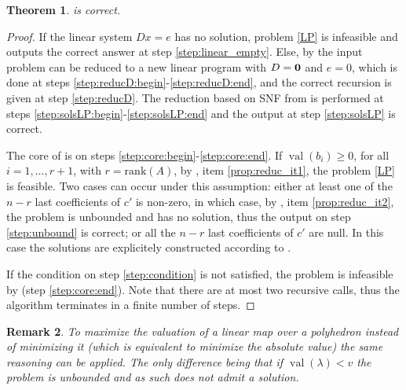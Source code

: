 \documentclass[sigconf]{acmart}
\newtheorem{theorem}{Theorem}[section]
\newtheorem{remark}[theorem]{Remark}
\DeclareMathOperator{\val}{val}
\begin{document}
\begin{theorem}  is correct.
\end{theorem}
\begin{proof}
  If the linear system $Dx=e$ has no solution, problem \eqref{LP} is infeasible
  and  outputs the correct answer at step \ref{step:linear_empty}.
  Else, by  the input problem can be reduced to a new linear
  program with $D={\bf 0}$ and $e=0$, which is done at steps
  \ref{step:reducD:begin}-\ref{step:reducD:end},
  and the correct recursion is given at step \ref{step:reducD}.
  The reduction based on SNF from  is performed at
  steps \ref{step:solsLP:begin}-\ref{step:solsLP:end} and the output
  at step \ref{step:solsLP} is correct.
  
  The core of  is on steps \ref{step:core:begin}-\ref{step:core:end}.
  If $\val(b_i) \geq 0$, for all $i=1,\ldots,r+1$, with $r = \mathrm{rank}(A)$,
  by , item \ref{prop:reduc_it1}, the problem \eqref{LP} is feasible.
  Two cases can occur under this assumption:
  either at least one of the $n-r$ last coefficients of $c'$ is non-zero,
  in which case,
  by , item \ref{prop:reduc_it2}, the problem is
  unbounded and has no solution, thus the output on step \ref{step:unbound} is correct;
  or all the $n-r$ last coefficients of $c'$ are null. In this case the solutions
  are explicitely constructed according to .

  If the condition on step \ref{step:condition} is not satisfied, the problem
  is infeasible by  (step \ref{step:core:end}).
  Note that there are at most two recursive calls, thus
  the algorithm terminates in a finite number of steps.
\end{proof}


\begin{remark}
  To maximize the valuation of a linear map over a polyhedron instead of minimizing it 
  (which is equivalent to minimize the absolute value) the same reasoning can be applied. 
  The only difference being that if $\val\left( \lambda\right) < v$ the problem is unbounded
  and as such does not admit a solution. 
\end{remark}
\end{document}
